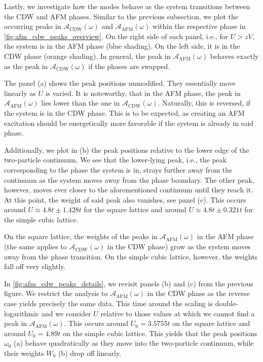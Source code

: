 \documentclass[
    reprint, 
    aps,
    preprintnumbers,
    twocolumn,
    prb,
    superscriptaddress
]{revtex4-2}
\newcommand{\spectral}[1]{\mathcal{A}_\text{#1}  (\omega)}
\begin{document}
Lastly, we investigate how the modes behave as the system transitions between the CDW and AFM phases.
Similar to the previous subsection, we plot the occurring peaks in $\spectral{CDW}$ and $\spectral{AFM}$ within the respective phase in \autoref{fig:afm_cdw_peaks_overview}.
On the right side of each panel, i.e., for $U > zV$, the system is in the AFM phase (blue shading).
On the left side, it is in the CDW phase (orange shading).
In general, the peak in $\spectral{AFM}$ behaves exactly as the peak in $\spectral{CDW}$ if the phases are swapped.

The panel (a) shows the peak positions unmodified. They essentially move linearly as $U$ is varied.
It is noteworthy, that in the AFM phase, the peak in $\spectral{AFM}$ lies lower than the one in $\spectral{CDW}$.
Naturally, this is reversed, if the system is in the CDW phase.
This is to be expected, as creating an AFM excitation should be energetically more favorable if the system is already in said phase.

Additionally, we plot in (b) the peak positions relative to the lower edge of the two-particle continuum.
We see that the lower-lying peak, i.e., the peak corresponding to the phase the system is in, 
strays further away from the continuum as the system moves away from the phase boundary.
The other peak, however, moves ever closer to the aforementioned continuum until they reach it.
At this point, the weight of said peak also vanishes, see panel (c).
This occurs around $U \approx 4.8t \pm 1.428t$ for the square lattice and around $U \approx 4.8t \pm 0.321t$ for the simple cubic lattice.

On the square lattice, the weights of the peaks in $\spectral{AFM}$ in the AFM phase (the same applies to $\spectral{CDW}$ in the CDW phase) grow as the system moves away from the phase transition.
On the simple cubic lattice, however, the weights fall off very slightly.

In \autoref{fig:afm_cdw_peaks_details}, we revisit panels (b) and (c) from the previous figure.
We restrict the analysis to $\spectral{AFM}$ in the CDW phase as the reverse case yields precisely the same data.
This time around the scaling is double-logarithmic and we consider $U$ relative to those values at which we cannot find a peak in $\spectral{AFM}$.
This occurs around $U_0 = 3.5755t$ on the square lattice and around $U_0 = 4.89t$ on the simple cubic lattice.
This yields that the peak positions $\omega_0$ (a) behave quadratically as they move into the two-particle continuum,
while their weights $W_0$ (b) drop off linearly.
\end{document}

